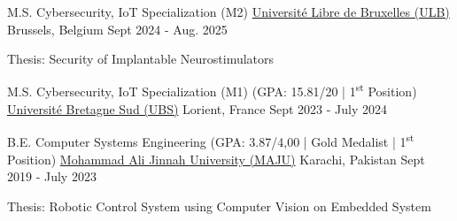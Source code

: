 

\begin{cventries}

  \cventry
    {M.S. Cybersecurity, IoT Specialization (M2)} %
    {\href{https://www.ulb.be/en/programme/m-secum}{Université Libre de Bruxelles (ULB)}} %
    {Brussels, Belgium} %
    {Sept 2024 - Aug. 2025} %
    {
      \begin{cvitems} %
        \item[] {Thesis: Security of Implantable Neurostimulators} 
      \end{cvitems}
    }
    

\cventryshort
    {M.S. Cybersecurity, IoT Specialization  (M1) (GPA: 15.81/20 | 1\textsuperscript{st} Position)} %
    {\href{https://www.univ-ubs.fr/}{Université Bretagne Sud (UBS)}} %
    {Lorient, France} %
    {Sept 2023 - July 2024} %
    
\cventryshort
    {B.E. Computer Systems Engineering (GPA: 3.87/4,00 | Gold Medalist | 1\textsuperscript{st} Position)} %
    {\href{https://jinnah.edu/}{Mohammad Ali Jinnah University (MAJU)}} %
    {Karachi, Pakistan} %
    {Sept 2019 - July 2023} %
    {
      \begin{cvitems} %
        \item[] {Thesis: Robotic Control System using Computer Vision on Embedded System}
      \end{cvitems}
    }
\vspace{1em}
\end{cventries}
